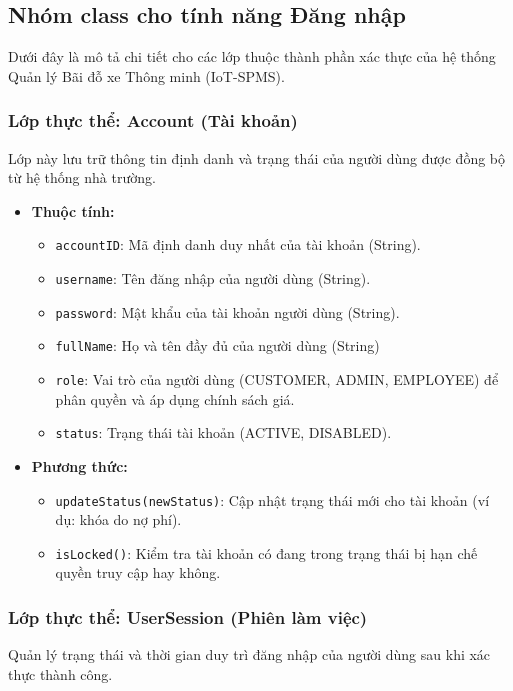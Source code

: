 \subsection{Nhóm class cho tính năng Đăng nhập}

Dưới đây là mô tả chi tiết cho các lớp thuộc thành phần xác thực của hệ thống Quản lý Bãi đỗ xe Thông minh (IoT-SPMS).

\subsubsection{Lớp thực thể: Account (Tài khoản)}
Lớp này lưu trữ thông tin định danh và trạng thái của người dùng được đồng bộ từ hệ thống nhà trường.

\begin{itemize}
    \item \textbf{Thuộc tính:}
    \begin{itemize}
        \item \texttt{accountID}: Mã định danh duy nhất của tài khoản (String).
        \item \texttt{username}: Tên đăng nhập của người dùng (String).
        \item \texttt{password}: Mật khẩu của tài khoản người dùng (String).
        \item \texttt{fullName}: Họ và tên đầy đủ của người dùng (String)
        \item \texttt{role}: Vai trò của người dùng (CUSTOMER, ADMIN, EMPLOYEE) để phân quyền và áp dụng chính sách giá.
        \item \texttt{status}: Trạng thái tài khoản (ACTIVE, DISABLED).
    \end{itemize}
    \item \textbf{Phương thức:}
    \begin{itemize}
        \item \texttt{updateStatus(newStatus)}: Cập nhật trạng thái mới cho tài khoản (ví dụ: khóa do nợ phí).
        \item \texttt{isLocked()}: Kiểm tra tài khoản có đang trong trạng thái bị hạn chế quyền truy cập hay không.
    \end{itemize}
\end{itemize}

\subsubsection{Lớp thực thể: UserSession (Phiên làm việc)}
Quản lý trạng thái và thời gian duy trì đăng nhập của người dùng sau khi xác thực thành công.


